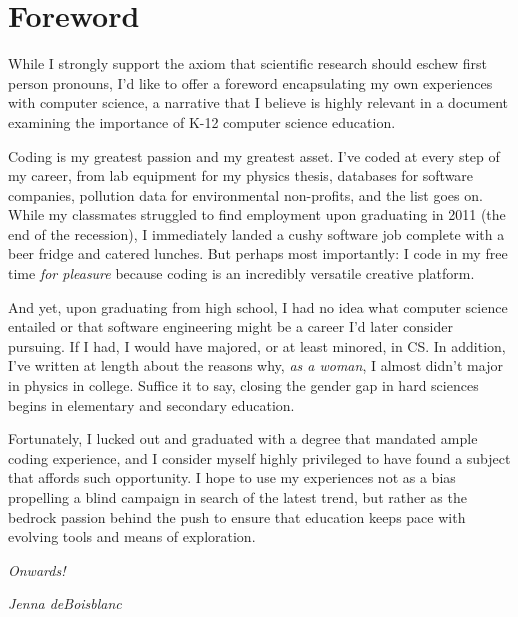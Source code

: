 \chapter{Foreword} %

\label{Foreword} %


While I strongly support the axiom that scientific research should eschew first person pronouns, I'd like to offer a foreword encapsulating my own experiences with computer science, a narrative that I believe is highly relevant in a document examining the importance of K-12 computer science education. \par  
Coding is my greatest passion and my greatest asset. I've coded at every step of my career, from lab equipment for my physics thesis, databases for software companies, pollution data for environmental non-profits, and the list goes on. While my classmates struggled to find employment upon graduating in 2011 (the end of the recession), I immediately landed a cushy software job complete with a beer fridge and catered lunches. But perhaps most importantly: I code in my free time \emph{for pleasure} because coding is an incredibly versatile creative platform. \par
And yet, upon graduating from high school, I had no idea what computer science entailed or that software engineering might be a career I'd later consider pursuing. If I had, I would have majored, or at least minored, in CS. In addition, I've written at length about the reasons why, \textit{as a woman}, I almost didn't major in physics in college. Suffice it to say, closing the gender gap in hard sciences begins in elementary and secondary education. \par
Fortunately, I lucked out and graduated with a degree that mandated ample coding experience, and I consider myself highly privileged to have found a subject that affords such opportunity. I hope to use my experiences not as a bias propelling a blind campaign in search of the latest trend, but rather as the bedrock passion behind the push to ensure that education keeps pace with evolving tools and means of exploration. \par 
\emph{Onwards!} \par
\emph{Jenna deBoisblanc}
